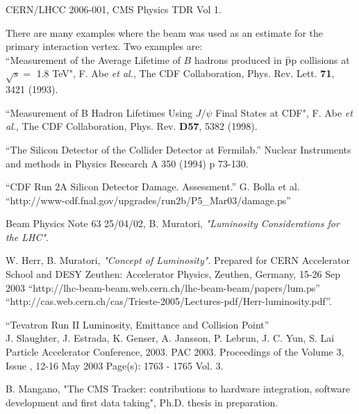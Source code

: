 \documentclass{cmspaper}
\begin{document}
\clearpage 
\begin{thebibliography}{9}

CERN/LHCC 2006-001, CMS Physics TDR Vol 1.

 There are many examples where the beam was used as an estimate for the primary interaction vertex. 
Two examples are: \\
``Measurement of the Average Lifetime of $B$ hadrons produced in $\bar{\rm p}$p  collisions at
$\sqrt{s}=$ 1.8 TeV", 
F. Abe {\it et al.}, The CDF Collaboration, Phys. Rev. Lett. {\bf 71}, 3421 (1993).

``Measurement of B Hadron Lifetimes Using $J/\psi$ Final States at CDF",
F. Abe {\it et al.}, The CDF Collaboration, Phys. Rev. {\bf D57}, 5382 (1998).

 ``The Silicon Detector of the Collider Detector at Fermilab.'' 
              Nuclear Instruments and methods in Physics Research A 350 (1994) p 73-130.

 ``CDF Run 2A Silicon Detector Damage. Assessment.'' G. Bolla et al.\\ 
``http://www-cdf.fnal.gov/upgrades/run2b/P5\_Mar03/damage.ps''

 {Beam Physics Note 63  25/04/02},
    B. Muratori,  {\em "Luminosity Considerations for the LHC"}.

    W. Herr, B. Muratori,  {\em "Concept of Luminosity"}. Prepared for CERN Accelerator School and DESY Zeuthen:
Accelerator Physics, Zeuthen, Germany, 15-26 Sep 2003
``http://lhc-beam-beam.web.cern.ch/lhc-beam-beam/papers/lum.ps''\\
``http://cas.web.cern.ch/cas/Trieste-2005/Lectures-pdf/Herr-luminosity.pdf''.


``Tevatron Run II Luminosity, Emittance and Collision Point''\\
J. Slaughter, J. Estrada, K. Genser, A. Jansson, P. Lebrun, J.
C. Yun, S. Lai\\
Particle Accelerator Conference, 2003. PAC 2003. Proceedings of the
Volume 3, Issue , 12-16 May 2003 Page(s): 1763 - 1765 Vol. 3.

B. Mangano, "The CMS Tracker: contributions to hardware integration, software development and first data taking", Ph.D. thesis in preparation. 



\end{thebibliography}
\end{document}
